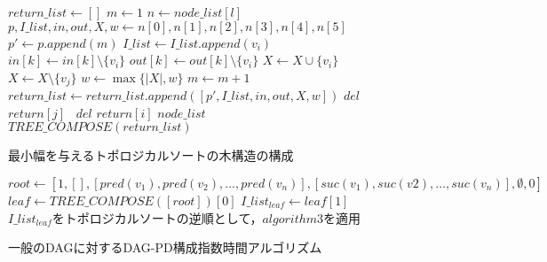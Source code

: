 \documentclass{kuisthesis}           %
\begin{document}
 \begin{figure}[!t]
 \begin{algorithm}[H]
    \caption{最小幅を与えるトポロジカルソートの木構造の構成}
    \label{alg5}
    \begin{algorithmic}[1]
    \State $return\_list \leftarrow []$
    \State $m \leftarrow 1$
    \State $n \leftarrow node\_list[l]$
    \State $p, I\_list, in, out, X, w \leftarrow n[0], n[1], n[2], n[3], n[4], n[5]$
    \State $p' \leftarrow p.append(m)$
    \State $I\_list \leftarrow I\_list.append(v_i)$
    \State $in[k] \leftarrow in[k] \setminus \{v_i\}$
    \State $out[k] \leftarrow out[k] \setminus \{v_i\}$
    \EndFor
    \State $X \leftarrow X \cup \{v_i\}$
    \State $X \leftarrow X \setminus \{v_j\}$
    \EndIf
    \EndFor
    \State $w \leftarrow  \max\{|X|, w\}$
    \State $m \leftarrow m+1$
    \State $return\_list \leftarrow return\_list.append([p', I\_list, in, out, X, w])$
    \EndIf
    \EndFor
    \EndFor
    \State $del$ $return[j]$
    \Else \, $del$ $return[i]$
    \EndIf
    \EndIf
    \EndFor
    \EndFor
    \Return $node\_list$
    \Else{} \Return $TREE\_COMPOSE(return\_list)$
    \EndIf
    \EndFunction
    \end{algorithmic}
 \end{algorithm}
 \end{figure}


 \clearpage


 \begin{figure}[!t] %
 \begin{algorithm}[H]
    \small
    \caption{一般のDAGに対するDAG-PD構成指数時間アルゴリズム}
    \label{alg4}
    \begin{algorithmic}[1]
    \State $root \leftarrow [1, [], [pred(v_1), pred(v_2),   \ldots, pred(v_n)], [suc(v_1), suc(v2),   \ldots, suc(v_n)], \emptyset, 0]$
    \State $leaf \leftarrow TREE\_COMPOSE([root])[0]$
    \State $I\_list_{leaf} \leftarrow leaf[1]$
    \State $I\_list_{leaf}$をトポロジカルソートの逆順として，$algorithm3$を適用
    \end{algorithmic}
 \end{algorithm}
 \end{figure}
\end{document}
